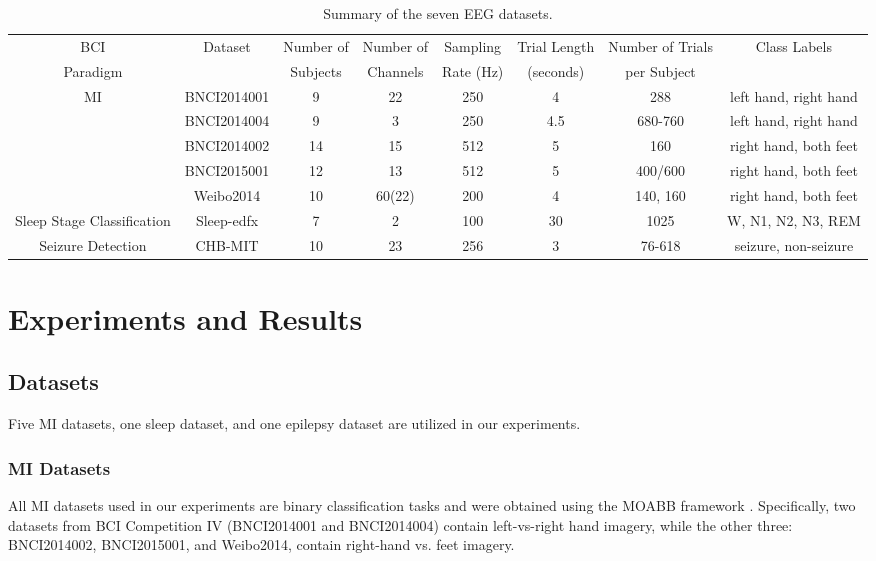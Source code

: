 \documentclass[journal,twocolumn]{IEEEtran}
\begin{document}
\begin{table}[htpb] \centering
  \caption{Summary of the seven EEG datasets.}
  \label{tab:datasets}
  \begin{tabular}{c|c|c|c|c|c|c|c}
  \toprule
  BCI&\multirow{2}{*}{Dataset} & Number of & Number of & Sampling & Trial Length & Number of Trials  & \multirow{2}{*}{Class Labels} \\
  Paradigm& & Subjects & Channels & Rate (Hz) & (seconds) & per Subject &  \\
  \midrule
  \multirow{4}{*}{MI}&BNCI2014001 & 9 & 22 & 250 & 4  & 288 &  left hand, right hand \\
  &BNCI2014004 & 9 & 3 & 250 & 4.5 & 680-760 &  left hand, right hand \\
  &BNCI2014002 & 14 & 15 & 512 & 5 & 160 &  right hand, both feet \\
  &BNCI2015001 & 12 & 13 & 512 & 5 & 400/600 &  right hand, both feet \\
  &Weibo2014 & 10 & 60(22) & 200 & 4 & 140, 160 &  right hand, both feet \\
  \midrule
  Sleep Stage Classification&Sleep-edfx& 7 & 2 & 100 & 30 & 1025 &  W, N1, N2, N3, REM \\
  \midrule
  Seizure Detection&CHB-MIT&10&23&256&3&76-618&seizure, non-seizure \\
  \bottomrule
  \end{tabular}
\end{table}


\section{Experiments and Results}\label{sec:exp}
\subsection{Datasets}
Five MI datasets, one sleep dataset, and one epilepsy dataset are utilized in our experiments.

\subsubsection{MI Datasets}
All MI datasets used in our experiments are binary classification tasks and were obtained using the MOABB framework \cite{jayaram2018moabb}. Specifically, two datasets from BCI Competition IV (BNCI2014001 and BNCI2014004) \cite{tangermann2012review} contain left-vs-right hand imagery, while the other three: BNCI2014002, BNCI2015001, and Weibo2014, contain right-hand vs. feet imagery. 
\end{document}
